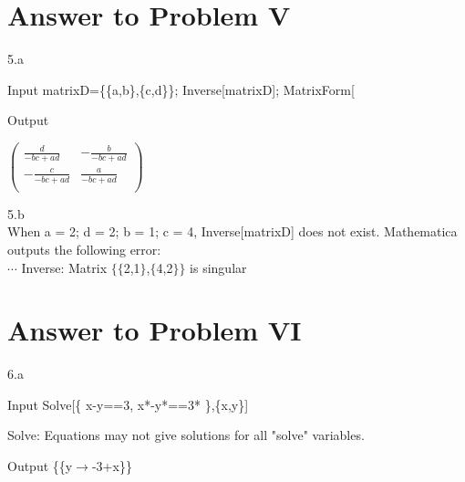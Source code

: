 \documentclass[11pt,a4paper]{article}
\begin{document}
\clearpage
\section{Answer to Problem V}\label{sec:P05}

5.a\\
\begin{mmaCell}[moredefined={matrixD}]{Input}
matrixD=\{\{a,b\},\{c,d\}\};
Inverse[matrixD];
MatrixForm[%
\end{mmaCell}

\begin{mmaCell}[form=MatrixForm]{Output}

\end{mmaCell}

\begin{doublespace}
\noindent\(\left(
\begin{array}{cc}
 \frac{d}{-b c+a d} & -\frac{b}{-b c+a d} \\
 -\frac{c}{-b c+a d} & \frac{a}{-b c+a d} \\
\end{array}
\right)\)
\end{doublespace}

5.b\\
When { }a = 2; d = 2; b = 1; c = 4, Inverse[matrixD] does not exist. Mathematica outputs the following error:\\
$\cdots $ Inverse: Matrix $\{\{$2,1$\}$,$\{$4,2$\}\}$ is singular

\clearpage
\section{Answer to Problem VI}\label{sec:P06}

6.a\\
\begin{mmaCell}[morefunctionlocal={x, y}]{Input}
Solve[\{
  x-y==3,
  x*\mmaDef{\(\pmb{\pi}\)}-y*\mmaDef{\(\pmb{\pi}\)}==3*\mmaDef{\(\pmb{\pi}\)}
\},\{x,y\}]
\end{mmaCell}

Solve: Equations may not give solutions for all "solve" variables.

\begin{mmaCell}{Output}
\{\{y\(\to\)-3+x\}\}
\end{mmaCell}
\end{document}
